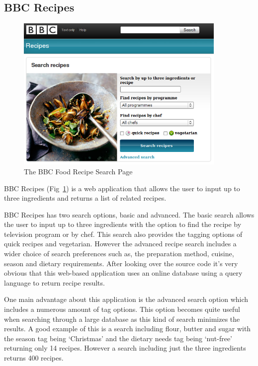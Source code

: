 \subsection{BBC Recipes}

\begin{figure}[h]
\includegraphics[width=0.9\textwidth]{screenshot_bbc_recipes}
\caption{The BBC Food Recipe Search Page}
\label{fig:bbc_food}
\end{figure}


BBC Recipes (Fig~\ref{fig:bbc_food}) is a web application that allows the user to input up to three ingredients and returns a list of related recipes. 

BBC Recipes has two search options, basic and advanced. The basic search allows the user to input up to three ingredients with the option to find the recipe by television program or by chef. This search also provides the tagging options of quick recipes and vegetarian. However the advanced recipe search includes a wider choice of search preferences such as, the preparation method, cuisine, season and dietary requirements. After looking over the source code it’s very obvious that this web-based application uses an online database using a query language to return recipe results. 

One main advantage about this application is the advanced search option which includes a numerous amount of tag options. This option becomes quite useful when searching through a large database as this kind of search minimizes the results. A good example of this is a search including flour, butter and sugar with the season tag being ‘Christmas’ and the dietary needs tag being ‘nut-free’ returning only 14 recipes. However a search including just the three ingredients returns 400 recipes. 

